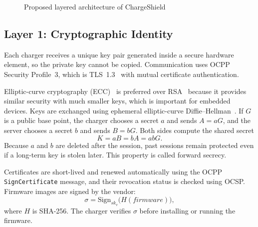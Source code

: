 \documentclass[runningheads]{llncs}
\begin{document}
\begin{figure}[t]
\centering
{}
\caption{Proposed layered architecture of ChargeShield}
\label{fig:chargeshield}
\end{figure}

\subsection{Layer 1: Cryptographic Identity}
Each charger receives a unique key pair generated inside a secure hardware element, so the private key cannot be copied. Communication uses OCPP Security Profile~3, which is TLS~1.3~\cite{rfc8446} with mutual certificate authentication.

Elliptic-curve cryptography (ECC)~\cite{koblitz1987elliptic} is preferred over RSA~\cite{rivest1978method} because it provides similar security with much smaller keys, which is important for embedded devices. Keys are exchanged using ephemeral elliptic-curve Diffie--Hellman~\cite{diffie1976new}. If $G$ is a public base point, the charger chooses a secret $a$ and sends $A = aG$, and the server chooses a secret $b$ and sends $B = bG$. Both sides compute the shared secret
\begin{equation}
K = aB = bA = abG.
\end{equation}
Because $a$ and $b$ are deleted after the session, past sessions remain protected even if a long-term key is stolen later. This property is called forward secrecy.

Certificates are short-lived and renewed automatically using the OCPP \texttt{SignCertificate} message, and their revocation status is checked using OCSP. Firmware images are signed by the vendor:
\begin{equation}
\sigma = \mathrm{Sign}_{sk_v}\big(H(\mathit{firmware})\big),
\end{equation}
where $H$ is SHA-256. The charger verifies $\sigma$ before installing or running the firmware.
\end{document}
